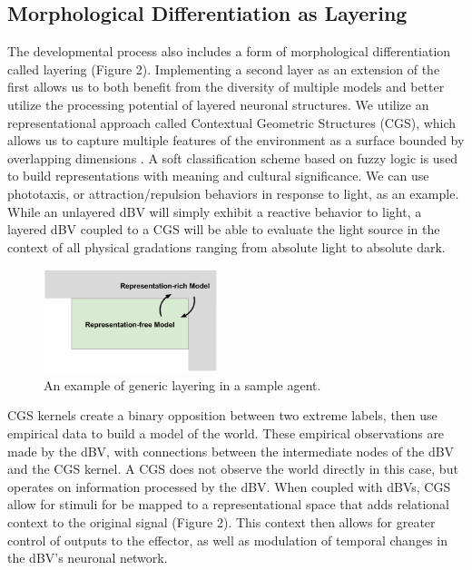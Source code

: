 \documentclass[letterpaper]{article}
\begin{document}
\subsection{Morphological Differentiation as Layering}
The developmental process also includes a form of morphological differentiation called layering (Figure 2). Implementing a second layer as an extension of the first allows us to both benefit from the diversity of multiple models and better utilize the processing potential of layered neuronal structures. We utilize an representational approach called Contextual Geometric Structures (CGS), which allows us to capture multiple features of the environment as a surface bounded by overlapping dimensions \cite{[9]}. A soft classification scheme based on fuzzy logic is used to build representations with meaning and cultural significance. We can use phototaxis, or attraction/repulsion behaviors in response to light, as an example. While an unlayered dBV will simply exhibit a reactive behavior to light, a layered dBV coupled to a CGS will be able to evaluate the light source in the context of all physical gradations ranging from absolute light to absolute dark. 

\begin{figure}[!htb]
\begin{center}
\includegraphics[width=2in]{Figure 2.png}
\caption{An example of generic layering in a sample agent.}
\label{fig2}
\end{center}
\end{figure}

CGS kernels create a binary opposition between two extreme labels, then use empirical data to build a model of the world. These empirical observations are made by the dBV, with connections between the intermediate nodes of the dBV and the CGS kernel. A CGS does not observe the world directly in this case, but operates on information processed by the dBV. When coupled with dBVs, CGS allow for stimuli for be mapped to a representational space that adds relational context to the original signal (Figure 2). This context then allows for greater control of outputs to the effector, as well as modulation of temporal changes in the dBV's neuronal network. 
\end{document}
